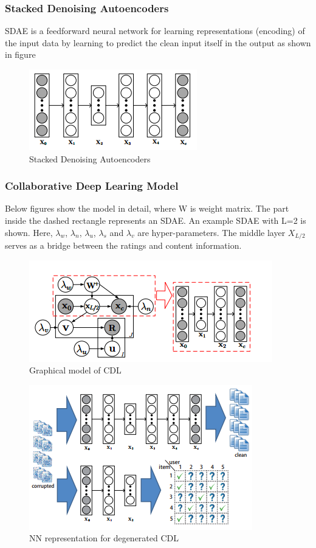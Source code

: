 \documentclass[11pt]{article}
\begin{document}
		\subsubsection{Stacked Denoising Autoencoders}
		SDAE \cite{sdae} is a feedforward neural network for learning representations (encoding) of the input data by learning to predict the clean input itself in the output as shown in figure
		\begin{figure}[h]
			\centering
			\includegraphics[scale=0.7]{sdae.png}
			\caption{Stacked Denoising Autoencoders}
		\end{figure}
		
		\subsubsection{Collaborative Deep Learing Model}
		Below figures show the model in detail, where W is weight matrix. The part inside the dashed rectangle represents an SDAE. An example SDAE with L=2 is shown. Here, $\lambda_w$, $\lambda_n$, $\lambda_u$, $\lambda_s$ and $\lambda_v$ are hyper-parameters. The middle layer $X_{L/2}$ serves as a bridge between the ratings and content information. 
		
		\begin{figure}[h]
			\centering
			\includegraphics[scale=0.7]{cdl.png}
			\caption{Graphical model of CDL}
		\end{figure}
		\begin{figure}[h]
			\centering
			\includegraphics[scale=0.7]{cdl1.png}
			\caption{NN representation for degenerated CDL}
		\end{figure}
\end{document}
